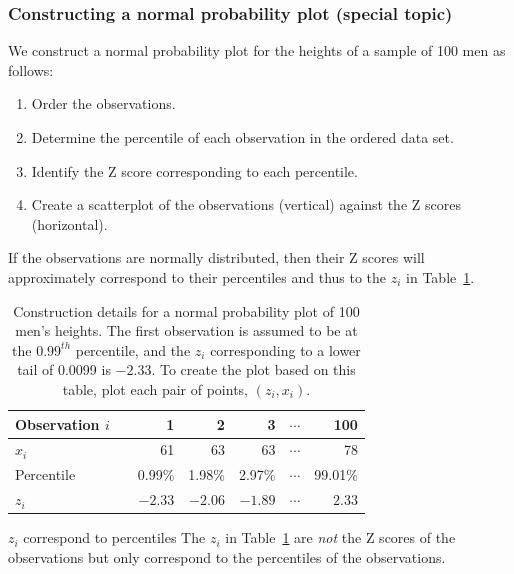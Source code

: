 

\subsubsection{Constructing a normal probability plot (special topic)}
\label{constructNormalProbabilityPlotSection}

We construct a normal probability plot for the heights of a sample of 100 men as follows:
\begin{enumerate}
\setlength{\itemsep}{0mm}
\item[(1)] Order the observations.
\item[(2)] Determine the percentile of each observation in the ordered data set.
\item[(3)] Identify the Z score corresponding to each percentile.
\item[(4)] Create a scatterplot of the observations (vertical) against the Z scores (horizontal).
\end{enumerate}
If the observations are normally distributed, then their Z scores will approximately correspond to their percentiles and thus to the $z_i$ in Table~\ref{normalQuantileConstructionTable}.

\begin{table}[H]
\centering
\begin{tabular}{l c r r r c r}
   \hline
   Observation $i$ & \hspace{2mm} & 1 & 2 & 3 & $\cdots$ & 100 \\
   \hline
   $x_i$ && 61 & 63 & 63 & $\cdots$ & 78 \\
   Percentile && 0.99\% & 1.98\% & 2.97\% & $\cdots$ & 99.01\% \\
   $z_i$ && $-2.33$ & $-2.06$ & $-1.89$ & $\cdots$ & $2.33$ \\
   \hline
\end{tabular}
\caption{Construction details for a normal probability plot of 100 men's heights. The first observation is assumed to be at the $0.99^{th}$ percentile, and the $z_i$ corresponding to a lower tail of 0.0099 is $-2.33$. To create the plot based on this table, plot each pair of points, $(z_i, x_i)$.}
\label{normalQuantileConstructionTable}
\end{table}

\begin{caution}{$z_i$ correspond to percentiles}{
The $z_i$ in Table~\ref{normalQuantileConstructionTable} are \emph{not} the Z scores of the observations but only correspond to the percentiles of the observations.}
\end{caution}

